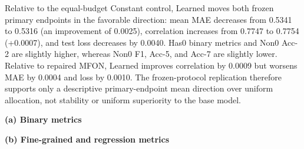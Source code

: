 Relative to the equal-budget Constant control, Learned moves both frozen
primary endpoints in the favorable direction: mean MAE decreases from 0.5341
to 0.5316 (an improvement of 0.0025), correlation increases from 0.7747 to
0.7754 (+0.0007), and test loss decreases by 0.0040. Has0 binary metrics and
Non0 Acc-2 are slightly higher, whereas Non0 F1, Acc-5, and Acc-7 are slightly
lower. Relative to repaired MFON, Learned improves correlation by 0.0009 but
worsens MAE by 0.0004 and loss by 0.0010. The frozen-protocol replication
therefore supports only a descriptive primary-endpoint mean direction over
uniform allocation, not stability or uniform superiority to the base model.

\begin{table}[t]
\caption{Clean CMU-MOSEI test performance (mean $\pm$ sample standard
deviation over seeds 1111, 1112, and 1113). Bold marks the better value
between the two equal-budget P4 variants.}
\label{tab:mosei-results}
\centering
\small
\textbf{(a) Binary metrics}\par\smallskip
{}

\vspace{0.7em}
\textbf{(b) Fine-grained and regression metrics}\par\smallskip
{}
\end{table}

